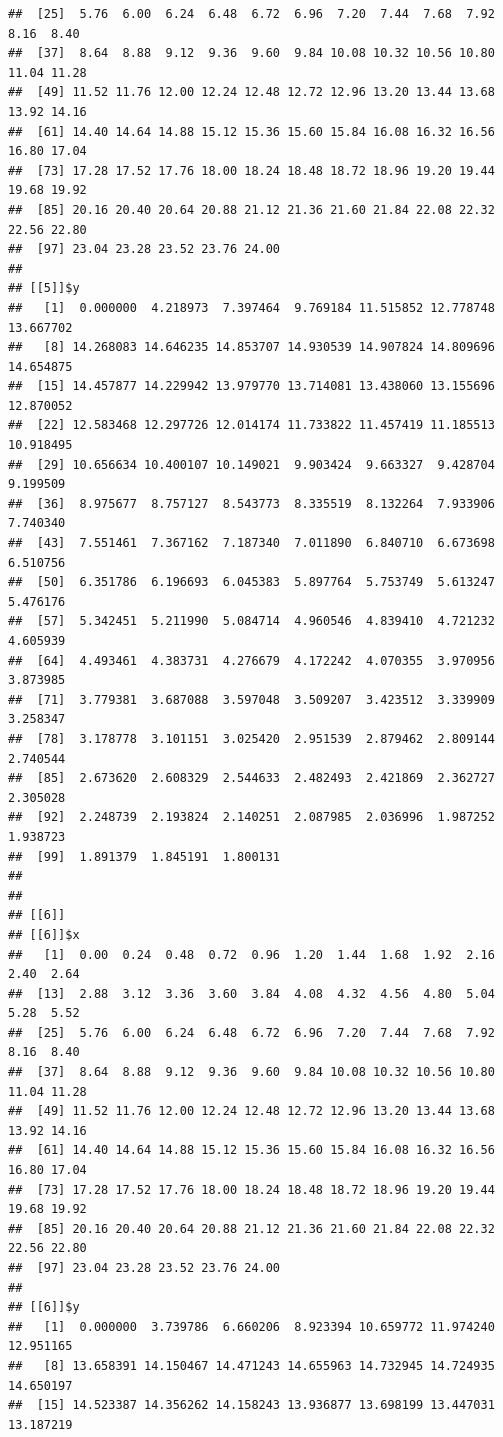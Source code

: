 \documentclass[
  ignorenonframetext,
]{beamer}
\begin{document}
\begin{frame}[fragile]{}
\begin{verbatim}
##  [25]  5.76  6.00  6.24  6.48  6.72  6.96  7.20  7.44  7.68  7.92  8.16  8.40
##  [37]  8.64  8.88  9.12  9.36  9.60  9.84 10.08 10.32 10.56 10.80 11.04 11.28
##  [49] 11.52 11.76 12.00 12.24 12.48 12.72 12.96 13.20 13.44 13.68 13.92 14.16
##  [61] 14.40 14.64 14.88 15.12 15.36 15.60 15.84 16.08 16.32 16.56 16.80 17.04
##  [73] 17.28 17.52 17.76 18.00 18.24 18.48 18.72 18.96 19.20 19.44 19.68 19.92
##  [85] 20.16 20.40 20.64 20.88 21.12 21.36 21.60 21.84 22.08 22.32 22.56 22.80
##  [97] 23.04 23.28 23.52 23.76 24.00
## 
## [[5]]$y
##   [1]  0.000000  4.218973  7.397464  9.769184 11.515852 12.778748 13.667702
##   [8] 14.268083 14.646235 14.853707 14.930539 14.907824 14.809696 14.654875
##  [15] 14.457877 14.229942 13.979770 13.714081 13.438060 13.155696 12.870052
##  [22] 12.583468 12.297726 12.014174 11.733822 11.457419 11.185513 10.918495
##  [29] 10.656634 10.400107 10.149021  9.903424  9.663327  9.428704  9.199509
##  [36]  8.975677  8.757127  8.543773  8.335519  8.132264  7.933906  7.740340
##  [43]  7.551461  7.367162  7.187340  7.011890  6.840710  6.673698  6.510756
##  [50]  6.351786  6.196693  6.045383  5.897764  5.753749  5.613247  5.476176
##  [57]  5.342451  5.211990  5.084714  4.960546  4.839410  4.721232  4.605939
##  [64]  4.493461  4.383731  4.276679  4.172242  4.070355  3.970956  3.873985
##  [71]  3.779381  3.687088  3.597048  3.509207  3.423512  3.339909  3.258347
##  [78]  3.178778  3.101151  3.025420  2.951539  2.879462  2.809144  2.740544
##  [85]  2.673620  2.608329  2.544633  2.482493  2.421869  2.362727  2.305028
##  [92]  2.248739  2.193824  2.140251  2.087985  2.036996  1.987252  1.938723
##  [99]  1.891379  1.845191  1.800131
## 
## 
## [[6]]
## [[6]]$x
##   [1]  0.00  0.24  0.48  0.72  0.96  1.20  1.44  1.68  1.92  2.16  2.40  2.64
##  [13]  2.88  3.12  3.36  3.60  3.84  4.08  4.32  4.56  4.80  5.04  5.28  5.52
##  [25]  5.76  6.00  6.24  6.48  6.72  6.96  7.20  7.44  7.68  7.92  8.16  8.40
##  [37]  8.64  8.88  9.12  9.36  9.60  9.84 10.08 10.32 10.56 10.80 11.04 11.28
##  [49] 11.52 11.76 12.00 12.24 12.48 12.72 12.96 13.20 13.44 13.68 13.92 14.16
##  [61] 14.40 14.64 14.88 15.12 15.36 15.60 15.84 16.08 16.32 16.56 16.80 17.04
##  [73] 17.28 17.52 17.76 18.00 18.24 18.48 18.72 18.96 19.20 19.44 19.68 19.92
##  [85] 20.16 20.40 20.64 20.88 21.12 21.36 21.60 21.84 22.08 22.32 22.56 22.80
##  [97] 23.04 23.28 23.52 23.76 24.00
## 
## [[6]]$y
##   [1]  0.000000  3.739786  6.660206  8.923394 10.659772 11.974240 12.951165
##   [8] 13.658391 14.150467 14.471243 14.655963 14.732945 14.724935 14.650197
##  [15] 14.523387 14.356262 14.158243 13.936877 13.698199 13.447031 13.187219

\end{verbatim}
\end{frame}
\end{document}
